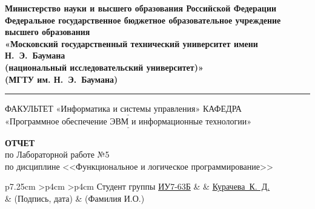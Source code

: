 
\begin{titlepage}
	\fontsize{12pt}{12pt}\selectfont
	\vspace*{-4cm}
	\begin{center}
		\textbf{Министерство науки и высшего образования Российской Федерации}\\
		\textbf{Федеральное государственное бюджетное образовательное учреждение высшего образования}\\
		\textbf{«Московский государственный технический университет имени Н.~Э.~Баумана}\\
		\textbf{(национальный исследовательский университет)»}\\
		\textbf{(МГТУ им. Н.~Э.~Баумана)}
	\end{center}
	
	\noindent\rule{17cm}{3pt}
	\newline\newline
	\noindent ФАКУЛЬТЕТ $\underline{\text{«Информатика и системы управления»}}$ \newline\newline
	\noindent КАФЕДРА $\underline{\text{«Программное обеспечение ЭВМ и информационные технологии»}}$\newline\newline\newline\newline\newline\newline\newline
	
	
	\begin{center}
		\textbf{\large ОТЧЕТ} \\
		\large по Лабораторной работе №5\\
		по дисциплине <<Функциональное и логическое программирование>>
	\end{center}
	
	\vspace{\baselineskip}
	\vspace{\baselineskip}
	
	\begin{table}[h!]
		\fontsize{12pt}{0.7\baselineskip}\selectfont
		\centering
		\begin{signstabular}[0.7]{p{7.25cm} >{\centering\arraybackslash}p{4cm} >{\centering\arraybackslash}p{4cm}}
			Студент группы \uline{ИУ7-63Б} & \uline{\mbox{\hspace*{4cm}}} & \uline{\hfill Курачева~К.~Д. \hfill} \\
			& \scriptsize (Подпись, дата) & \scriptsize (Фамилия И.О.)
		\end{signstabular}
		

\end{table}
\end{titlepage}
